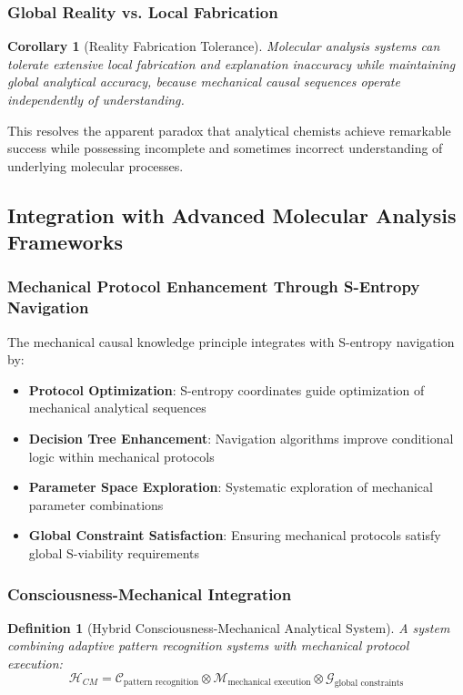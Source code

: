 \documentclass[11pt,a4paper]{article}
\newtheorem{corollary}[theorem]{Corollary}
\newtheorem{definition}[theorem]{Definition}
\theoremstyle{remark}
\begin{document}
\subsubsection{Global Reality vs. Local Fabrication}

\begin{corollary}[Reality Fabrication Tolerance]
Molecular analysis systems can tolerate extensive local fabrication and explanation inaccuracy while maintaining global analytical accuracy, because mechanical causal sequences operate independently of understanding.
\end{corollary}

This resolves the apparent paradox that analytical chemists achieve remarkable success while possessing incomplete and sometimes incorrect understanding of underlying molecular processes.

\subsection{Integration with Advanced Molecular Analysis Frameworks}

\subsubsection{Mechanical Protocol Enhancement Through S-Entropy Navigation}

The mechanical causal knowledge principle integrates with S-entropy navigation by:

\begin{itemize}
\item \textbf{Protocol Optimization}: S-entropy coordinates guide optimization of mechanical analytical sequences
\item \textbf{Decision Tree Enhancement}: Navigation algorithms improve conditional logic within mechanical protocols
\item \textbf{Parameter Space Exploration}: Systematic exploration of mechanical parameter combinations
\item \textbf{Global Constraint Satisfaction}: Ensuring mechanical protocols satisfy global S-viability requirements
\end{itemize}

\subsubsection{Consciousness-Mechanical Integration}

\begin{definition}[Hybrid Consciousness-Mechanical Analytical System]
A system combining adaptive pattern recognition systems with mechanical protocol execution:
$$\mathcal{H}_{CM} = \mathcal{C}_{\text{pattern recognition}} \otimes \mathcal{M}_{\text{mechanical execution}} \otimes \mathcal{G}_{\text{global constraints}}$$
\end{definition}
\end{document}

